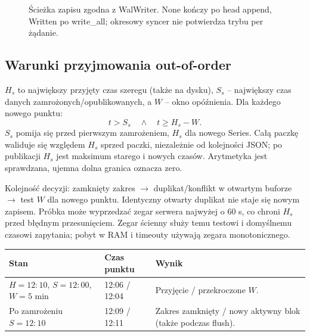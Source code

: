 \documentclass[11pt,a4paper]{article}
\begin{document}
\begin{figure}[htbp]
\centering
{}
\caption{Ścieżka zapisu zgodna z WalWriter. None kończy po head append,
Written po write\_all; okresowy syncer nie potwierdza trybu per żądanie.}
\end{figure}

\subsection{Warunki przyjmowania out-of-order}
$H_s$ to największy przyjęty czas szeregu (także na dysku), $S_s$ --
największy czas danych zamrożonych/opublikowanych, a $W$ -- okno
opóźnienia. Dla każdego nowego punktu:
\[
 t>S_s \quad\land\quad t\geq H_s-W.
\]
$S_s$ pomija się przed pierwszym zamrożeniem, $H_s$ dla nowego Series.
Całą paczkę waliduje się względem $H_s$ sprzed paczki, niezależnie od
kolejności JSON; po publikacji $H_s$ jest maksimum starego i nowych czasów.
Arytmetyka jest sprawdzana, ujemna dolna granica oznacza zero.

Kolejność decyzji: zamknięty zakres $\rightarrow$ duplikat/konflikt
w otwartym buforze $\rightarrow$ test $W$ dla nowego punktu.
Identyczny otwarty duplikat nie staje się nowym zapisem.
Próbka może wyprzedzać zegar serwera najwyżej o 60 s, co chroni $H_s$
przed błędnym przesunięciem. Zegar ścienny służy temu testowi i domyślnemu
czasowi zapytania; pobyt w RAM i timeouty używają zegara monotonicznego.

\begin{tabularx}{\linewidth}{P{63mm}P{28mm}Y}
\toprule
Stan & Czas punktu & Wynik\\ \midrule
$H=12{:}10$, $S=12{:}00$, $W=5$ min & 12:06 / 12:04 &
Przyjęcie / przekroczone $W$.\\
Po zamrożeniu $S=12{:}10$ & 12:09 / 12:11 &
Zakres zamknięty / nowy aktywny blok (także podczas flush).\\
\bottomrule
\end{tabularx}
\end{document}

